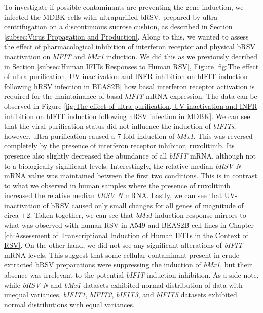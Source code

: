 To investigate if possible contaminants are preventing the gene induction, we infected the MDBK cells with ultrapurified bRSV, prepared by ultra-centrifugation on a discontinuous sucrose cushion, as described in Section \ref{subsec:Virus Propagation and Production}. Along to this, we wanted to assess the effect of pharmacological inhibition of interferon receptor and physical bRSV inactivation on \textit{bIFIT} and \textit{bMx1} induction. We did this as we previously decribed in Section \ref{subsec:Human IFITs Responses to Human RSV}, Figure \ref{fig:The effect of ultra-purification, UV-inactivation and INFR inhibition on hIFIT induction following hRSV infection in BEAS2B} how basal interferon receptor activation is required for the maintainance of basal \textit{hIFIT} mRNA expression. The data can be observed in Figure \ref{fig:The effect of ultra-purification, UV-inactivation and INFR inhibition on hIFIT induction following hRSV infection in MDBK}. We can see that the viral purification status did not influence the induction of \textit{bIFITs}, however, ultra-purification caused a 7-fold induction of \textit{bMx1}. This was reversed completely by the presence of interferon receptor inhibitor, ruxolitinib. Its presence also slightly decreased the abundance of all \textit{bIFIT} mRNA, although not to a biologically significant levels. Interestingly, the relative median \textit{bRSV N} mRNA value was maintained between the first two conditions. This is in contrast to what we observed in human samples where the presence of ruxolitinib increased the relative median \textit{bRSV N} mRNA. Lastly, we can see that UV-inactivation of bRSV caused only small changes for all genes of magnitude of circa \(\pm\)2. Taken together, we can see that \textit{bMx1} induction response mirrors to what was observed with human RSV in A549 and BEAS2B cell lines in Chapter \ref{ch:Assessment of Transcriptional Induction of Human IFITs in the Context of RSV}. On the other hand, we did not see any significant alterations of \textit{bIFIT} mRNA levels. This suggest that some cellular contaminant present in crude extracted bRSV preparations were suppressing the induction of \textit{bMx1}, but their absence was irrelevant to the potential \textit{bIFIT} induction inhibition. As a side note, while \textit{bRSV N} and \textit{bMx1} datasets exhibited normal distribution of data with unequal variances, \textit{bIFIT1}, \textit{bIFIT2}, \textit{bIFIT3}, and \textit{bIFIT5} datasets exhibited normal distributions with equal variances.

